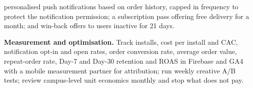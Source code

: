 \begin{qlist}
\begin{apts}
      personalised push notifications based on order history, capped in
      frequency to protect the notification permission; a subscription pass
      offering free delivery for a month; and win-back offers to users inactive
      for 21 days.
\item \textbf{Measurement and optimisation.} Track installs, cost per install
      and CAC, notification opt-in and open rates, order conversion rate,
      average order value, repeat-order rate, Day-7 and Day-30 retention and
      ROAS in Firebase and GA4 with a mobile measurement partner for
      attribution; run weekly creative A/B tests; review campus-level unit
      economics monthly and stop what does not pay.
\end{apts}


\end{qlist}

